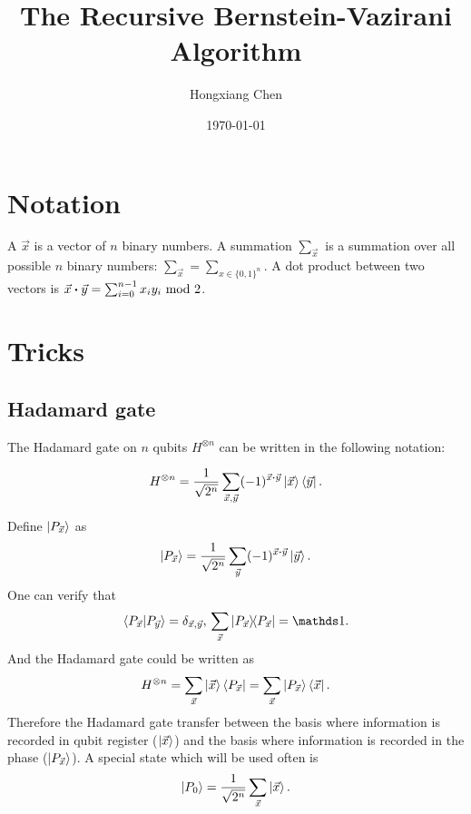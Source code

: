 \documentclass{article}
\title{The Recursive Bernstein-Vazirani Algorithm}
\date{\today}
\author{Hongxiang Chen}
\begin{document}
\maketitle
{}
\tableofcontents

\section{Notation}
\label{sec:Notation}

A $\vec{x}$ is a vector of $n$ binary numbers. A summation $\sum_{\vec{x}}$ is a
summation over all possible $n$ binary numbers: $\sum_{\vec{x}}=\sum_{x\in
  \{0,1\}^n}$. A dot product between two vectors is $\vec{x}\vdot\vec{y} =
  \sum_{i=0}^{n-1} x_i y_i \text{ mod }2$.

\section{Tricks}
\label{sec:Tricks}

\subsection{Hadamard gate}
\label{sec:Hadamard gate}

The Hadamard gate on $n$ qubits $H^{\otimes n}$ can be written in the following notation:

\begin{equation}
  H^{\otimes n} = \frac{1}{\sqrt{2^n}}\sum_{\vec{x},\vec{y}} (-1)^{\vec{x}\vdot\vec{y}}
  \ket{\vec{x}}\bra{\vec{y}}.
\end{equation}

Define $\ket{P_{\vec{x}}}$ as
\begin{equation}
  \ket{P_{\vec{x}}} = \frac{1}{\sqrt{2^n}} \sum_{\vec{y}}
  (-1)^{\vec{x}\vdot\vec{y}} \ket{\vec{y}}.
\end{equation}
One can verify that
\begin{equation}
  \braket{P_{\vec{x}} |P_{\vec{y}}} = \delta_{\vec{x},\vec{y}},\,
  \sum_{\vec{x}}\ketbra{P_{\vec{x}}} = \id.
\end{equation}
And the Hadamard gate could be written as
\begin{equation}
  H^{\otimes n} = \sum_{\vec{x}} \ket{\vec{x}}\bra{P_{\vec{x}}} 
  = \sum_{\vec{x}} \ket{P_{\vec{x}}} \bra{\vec{x}}.
\end{equation}
Therefore the Hadamard gate transfer between the basis where information is
recorded in qubit register ($\ket{\vec{x}}$) and the basis where information is
recorded in the phase ($\ket{P_{\vec{x}}}$). A special state which will be used
often is
\begin{equation}
  \ket{P_0} = \frac{1}{\sqrt{2^n}} \sum_{\vec{x}}\ket{\vec{x}}.
\end{equation}
\end{document}
